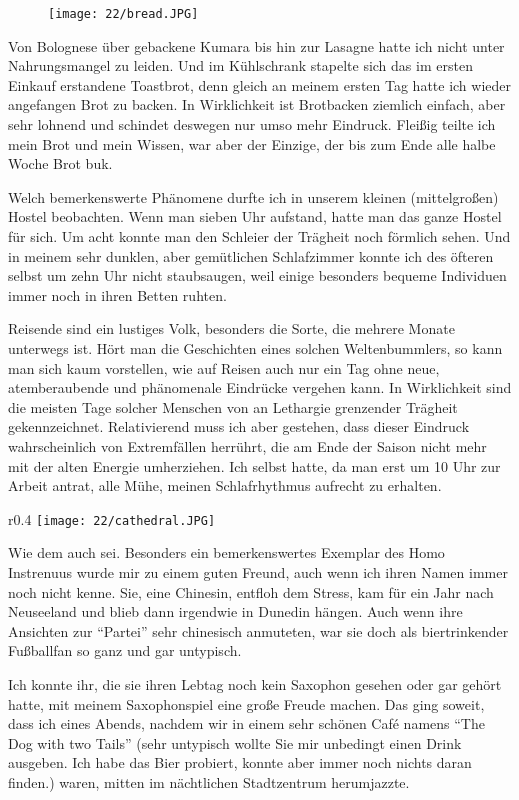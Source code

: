 \begin{figure}[h]
  \centering
  \texttt{[image: 22/bread.JPG]}
\end{figure}
Von Bolognese über gebackene Kumara bis hin zur Lasagne hatte ich
nicht unter Nahrungsmangel zu leiden. Und im Kühlschrank stapelte sich
das im ersten Einkauf erstandene Toastbrot, denn gleich an meinem
ersten Tag hatte ich wieder angefangen Brot zu backen. In Wirklichkeit
ist Brotbacken ziemlich einfach, aber sehr lohnend und schindet
deswegen nur umso mehr Eindruck. Fleißig teilte ich mein Brot und mein
Wissen, war aber der Einzige, der bis zum Ende alle halbe Woche Brot
buk.

Welch bemerkenswerte Phänomene durfte ich in unserem kleinen
(mittelgroßen) Hostel beobachten. Wenn man sieben Uhr aufstand, hatte
man das ganze Hostel für sich. Um acht konnte man den Schleier der
Trägheit noch förmlich sehen. Und in meinem sehr dunklen, aber
gemütlichen Schlafzimmer konnte ich des öfteren selbst um zehn Uhr
nicht staubsaugen, weil einige besonders bequeme Individuen immer noch
in ihren Betten ruhten.

Reisende sind ein lustiges Volk, besonders die Sorte, die mehrere
Monate unterwegs ist. Hört man die Geschichten eines solchen
Weltenbummlers, so kann man sich kaum vorstellen, wie auf Reisen auch
nur ein Tag ohne neue, atemberaubende und phänomenale Eindrücke
vergehen kann. In Wirklichkeit sind die meisten Tage solcher Menschen
von an Lethargie grenzender Trägheit gekennzeichnet. Relativierend
muss ich aber gestehen, dass dieser Eindruck wahrscheinlich von
Extremfällen herrührt, die am Ende der Saison nicht mehr mit der alten
Energie umherziehen. Ich selbst hatte, da man erst um 10 Uhr zur
Arbeit antrat, alle Mühe, meinen Schlafrhythmus aufrecht zu erhalten.
\begin{wrapfigure}{r}{0.4\textwidth}
  \centering
  \texttt{[image: 22/cathedral.JPG]}
\end{wrapfigure}

Wie dem auch sei. Besonders ein bemerkenswertes Exemplar des Homo
Instrenuus wurde mir zu einem guten Freund, auch wenn ich ihren Namen
immer noch nicht kenne. Sie, eine Chinesin, entfloh dem Stress, kam
für ein Jahr nach Neuseeland und blieb dann irgendwie in Dunedin
hängen.  Auch wenn ihre Ansichten zur ``Partei'' sehr chinesisch
anmuteten, war sie doch als biertrinkender Fußballfan so ganz und gar
untypisch.

Ich konnte ihr, die sie ihren Lebtag noch kein Saxophon
gesehen oder gar gehört hatte, mit meinem Saxophonspiel eine große
Freude machen. Das ging soweit, dass ich eines Abends, nachdem wir in
einem sehr schönen Café namens ``The Dog with two Tails'' (sehr
untypisch wollte Sie mir unbedingt einen Drink ausgeben. Ich habe das
Bier probiert, konnte aber immer noch nichts daran finden.) waren,
mitten im nächtlichen Stadtzentrum herumjazzte.

